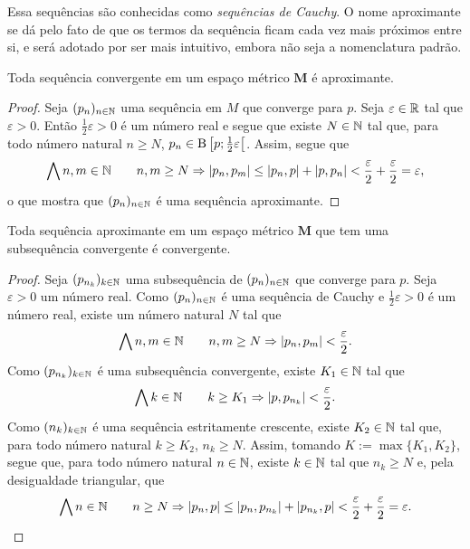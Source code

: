 Essa sequências são conhecidas como \emph{sequências de Cauchy}. O nome aproximante se dá pelo fato de que os termos da sequência ficam cada vez mais próximos entre si, e será adotado por ser mais intuitivo, embora não seja a nomenclatura padrão.

\begin{proposition}
Toda sequência convergente em um espaço métrico $\bm M$ é aproximante.
\end{proposition}
\begin{proof}
Seja $(p_n)_{n \in \mathbb{N}}$ uma sequência em $M$ que converge para $p$. Seja $\varepsilon \in \mathbb{R}$ tal que $\varepsilon > 0$. Então $\frac{1}{2}\varepsilon > 0$ é um número real e segue que existe $N \in \mathbb{N}$ tal que, para todo número natural $n \geq N$, $p_n \in \mathrm{B}\left[{p};{\frac{1}{2}\varepsilon}\right[$. Assim, segue que
	\begin{equation*}
	\bigwedge\nolimits n,m \in \mathbb{N} \qquad n,m \geq N \Rightarrow \left\vert{p_n},{p_m}\right\vert \leq \left\vert{p_n},{p}\right\vert + \left\vert{p},{p_n}\right\vert < \frac{\varepsilon}{2} + \frac{\varepsilon}{2} = \varepsilon,
	\end{equation*}
o que mostra que $(p_n)_{n \in \mathbb{N}}$ é uma sequência aproximante.
\end{proof}

\begin{proposition}
Toda sequência aproximante em um espaço métrico $\bm M$ que tem uma subsequência convergente é convergente.
\end{proposition}
\begin{proof}
	Seja $(p_{n_k})_{k \in \mathbb{N}}$ uma subsequência de $(p_n)_{n \in \mathbb{N}}$ que converge  para $p$. Seja $\varepsilon > 0$ um número real. Como $(p_n)_{n \in \mathbb{N}}$ é uma sequência de Cauchy e $\frac{1}{2}\varepsilon > 0$ é um número real, existe um número natural $N$ tal que
	\begin{equation*}
	\bigwedge\nolimits n,m \in \mathbb{N} \qquad n,m \geq N \Rightarrow \left\vert{p_n},{p_m}\right\vert < \frac{\varepsilon}{2}.
	\end{equation*}
Como $(p_{n_k})_{k \in \mathbb{N}}$ é uma subsequência convergente, existe $K_1 \in \mathbb{N}$ tal que
	\begin{equation*}
	\bigwedge\nolimits k \in \mathbb{N} \qquad k \geq K_1 \Rightarrow \left\vert{p},{p_{n_k}}\right\vert < \frac{\varepsilon}{2}.
	\end{equation*}
Como $(n_k)_{k \in \mathbb{N}}$ é uma sequência estritamente crescente, existe $K_2 \in \mathbb{N}$ tal que, para todo número natural $k \geq K_2$, $n_k \geq N$. Assim, tomando $K := \max\{K_1,K_2\}$, segue que, para todo número natural $n \in \mathbb{N}$, existe $k \in \mathbb{N}$ tal que $n_k \geq N$ e,  pela desigualdade triangular, que
	\begin{equation*}
	\bigwedge\nolimits n \in \mathbb{N} \qquad n \geq N \Rightarrow \left\vert{p_n},{p}\right\vert \leq \left\vert{p_n},{p_{n_k}}\right\vert + \left\vert{p_{n_k}},{p}\right\vert < \frac{\varepsilon}{2}+\frac{\varepsilon}{2}=\varepsilon.
	\end{equation*}
\end{proof}

